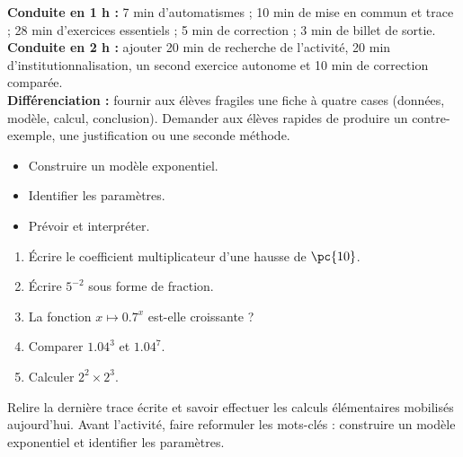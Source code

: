 \ifmxteacher
\begin{method}
\textbf{Conduite en 1 h :} 7 min d'automatismes ; 10 min de mise en commun et trace ; 28 min d'exercices essentiels ; 5 min de correction ; 3 min de billet de sortie.\\
\textbf{Conduite en 2 h :} ajouter 20 min de recherche de l'activité, 20 min d'institutionnalisation, un second exercice autonome et 10 min de correction comparée.\\
\textbf{Différenciation :} fournir aux élèves fragiles une fiche à quatre cases (données, modèle, calcul, conclusion). Demander aux élèves rapides de produire un contre-exemple, une justification ou une seconde méthode.
\end{method}
\fi
{}
\begin{objectives}\begin{itemize}\item Construire un modèle exponentiel.\item Identifier les paramètres.\item Prévoir et interpréter.\end{itemize}\end{objectives}
\begin{fluency}\begin{enumerate}\item Écrire le coefficient multiplicateur d'une hausse de $\pc{10}$. \item Écrire $5^{-2}$ sous forme de fraction. \item La fonction $x\mapsto\num{0,7}^x$ est-elle croissante ? \item Comparer $\num{1,04}^3$ et $\num{1,04}^7$. \item Calculer $2^2\times2^3$. \end{enumerate}\end{fluency}
\begin{prerequisites}Relire la dernière trace écrite et savoir effectuer les calculs élémentaires mobilisés aujourd'hui. Avant l'activité, faire reformuler les mots-clés : construire un modèle exponentiel et identifier les paramètres.\end{prerequisites}

